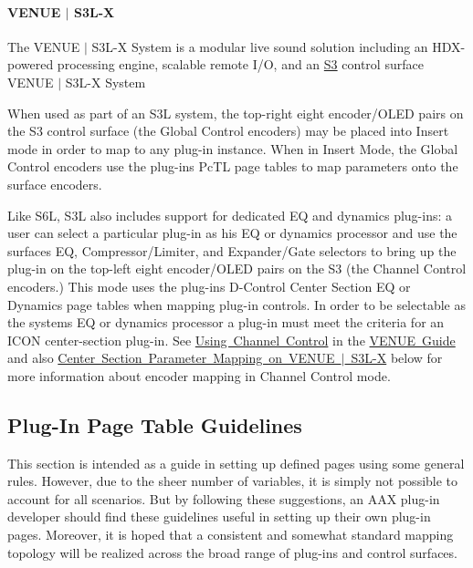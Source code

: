 \hypertarget{a00833_subsubsection__venue_s3l}{}\paragraph{V\+E\+N\+U\+E $\vert$ S3\+L-\/X}\label{a00833_subsubsection__venue_s3l}
The V\+E\+N\+UE $\vert$ S3\+L-\/X System is a modular live sound solution including an H\+D\+X-\/powered processing engine, scalable remote I/O, and an \mbox{\hyperlink{a00833_subsubsection__avid_s3}{S3}} control surface   V\+E\+N\+UE $\vert$ S3\+L-\/X System 

When used as part of an S3L system, the top-\/right eight encoder/\+O\+L\+ED pairs on the S3 control surface (the Global Control encoders) may be placed into Insert mode in order to map to any plug-\/in instance. When in Insert Mode, the Global Control encoders use the plug-\/in\textquotesingle{}s {\ttfamily \textquotesingle{}Pc\+TL\textquotesingle{}} page tables to map parameters onto the surface encoders.

Like S6L, S3L also includes support for dedicated EQ and dynamics plug-\/ins\+: a user can select a particular plug-\/in as his EQ or dynamics processor and use the surface\textquotesingle{}s EQ, Compressor/\+Limiter, and Expander/\+Gate selectors to bring up the plug-\/in on the top-\/left eight encoder/\+O\+L\+ED pairs on the S3 (the Channel Control encoders.) This mode uses the plug-\/in\textquotesingle{}s D-\/\+Control Center Section EQ or Dynamics page tables when mapping plug-\/in controls. In order to be selectable as the system\textquotesingle{}s EQ or dynamics processor a plug-\/in must meet the criteria for an I\+C\+ON center-\/section plug-\/in. See \mbox{\hyperlink{a00849_aax_venue_guide__systems__s3l__using_channel_control}{Using Channel Control}} in the \mbox{\hyperlink{a00849}{V\+E\+N\+UE Guide}} and also \mbox{\hyperlink{a00833_aax_page_table_guide_04_avid_center_section_page_tables_venue_s3l_mapping}{Center Section Parameter Mapping on V\+E\+N\+UE $\vert$ S3\+L-\/X}} below for more information about encoder mapping in Channel Control mode.



 \hypertarget{a00833_aax_page_table_guide_03_plug_in_page_table_guidelines}{}\subsection{Plug-\/\+In Page Table Guidelines}\label{a00833_aax_page_table_guide_03_plug_in_page_table_guidelines}
This section is intended as a guide in setting up defined \textquotesingle{}pages\textquotesingle{} using some general rules. However, due to the sheer number of variables, it is simply not possible to account for all scenarios. But by following these suggestions, an A\+AX plug-\/in developer should find these guidelines useful in setting up their own plug-\/in pages. Moreover, it is hoped that a consistent and somewhat standard mapping topology will be realized across the broad range of plug-\/ins and control surfaces.

